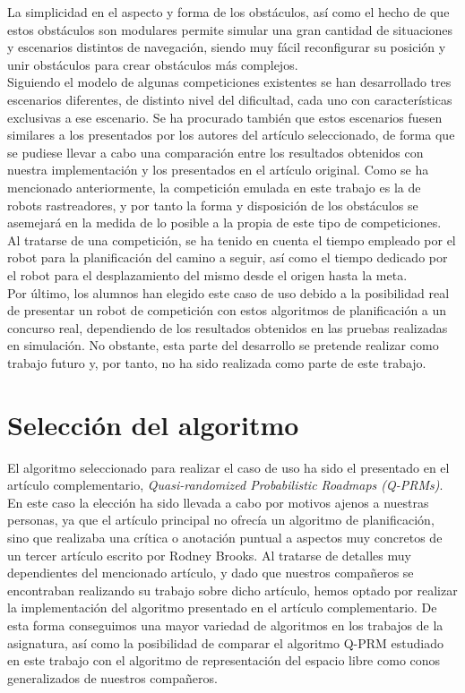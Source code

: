 La simplicidad en el aspecto y forma de los obstáculos, así como el hecho de que estos obstáculos son modulares permite simular una gran cantidad de situaciones y escenarios distintos de navegación, siendo muy fácil reconfigurar su posición y unir obstáculos para crear obstáculos más complejos.\\

Siguiendo el modelo de algunas competiciones existentes se han desarrollado tres escenarios diferentes, de distinto nivel del dificultad, cada uno con características exclusivas a ese escenario. Se ha procurado también que estos escenarios fuesen similares a los presentados por los autores del artículo seleccionado, de forma que se pudiese llevar a cabo una comparación entre los resultados obtenidos con nuestra implementación y los presentados en el artículo original. Como se ha mencionado anteriormente, la competición emulada en este trabajo es la de robots rastreadores, y por tanto la forma y disposición de los obstáculos se asemejará en la medida de lo posible a la propia de este tipo de competiciones.\\

Al tratarse de una competición, se ha tenido en cuenta el tiempo empleado por el robot para la planificación del camino a seguir, así como el tiempo dedicado por el robot para el desplazamiento del mismo desde el origen hasta la meta.\\

Por último, los alumnos han elegido este caso de uso debido a la posibilidad real de presentar un robot de competición con estos algoritmos de planificación a un concurso real, dependiendo de los resultados obtenidos en las pruebas realizadas en simulación. No obstante, esta parte del desarrollo se pretende realizar como trabajo futuro y, por tanto, no ha sido realizada como parte de este trabajo.\\


\section{Selección del algoritmo}
\label{justificacion}

El algoritmo seleccionado para realizar el caso de uso ha sido el presentado en el artículo complementario, \textit{Quasi-randomized Probabilistic Roadmaps (Q-PRMs)}.\\

En este caso la elección ha sido llevada a cabo por motivos ajenos a nuestras personas, ya que el artículo principal no ofrecía un algoritmo de planificación, sino que realizaba una crítica o anotación puntual a aspectos muy concretos de un tercer artículo escrito por Rodney Brooks. Al tratarse de detalles muy dependientes del mencionado artículo, y dado que nuestros compañeros se encontraban realizando su trabajo sobre dicho artículo, hemos optado por realizar la implementación del algoritmo presentado en el artículo complementario. De esta forma conseguimos una mayor variedad de algoritmos en los trabajos de la asignatura, así como la posibilidad de comparar el algoritmo Q-PRM estudiado en este trabajo con el algoritmo de representación del espacio libre como conos generalizados de nuestros compañeros.\\

